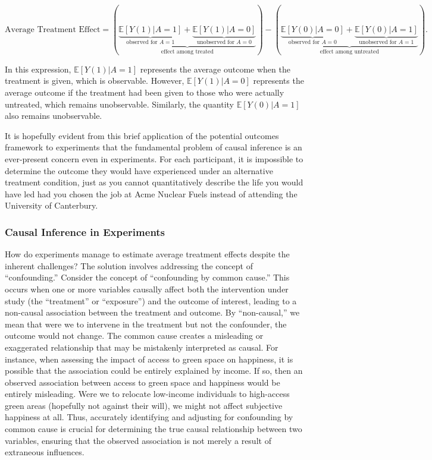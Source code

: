 \documentclass[
  singlecolumn]{article}
\begin{document}
\[
\text{Average Treatment Effect} = \left(\underbrace{\underbrace{\mathbb{E}[Y(1)|A = 1]}_{\text{observed for } A = 1} + \underbrace{\mathbb{E}[Y(1)|A = 0]}_{\text{unobserved for } A = 0}}_{\text{effect among treated}}\right) - \left(\underbrace{\underbrace{\mathbb{E}[Y(0)|A = 0]}_{\text{observed for } A = 0} + \underbrace{\mathbb{E}[Y(0)|A = 1]}_{\text{unobserved for } A = 1}}_{\text{effect among untreated}}\right).
\]

In this expression, \(\mathbb{E}[Y(1)|A = 1]\) represents the average
outcome when the treatment is given, which is observable. However,
\(\mathbb{E}[Y(1)|A = 0]\) represents the average outcome if the
treatment had been given to those who were actually untreated, which
remains unobservable. Similarly, the quantity \(\mathbb{E}[Y(0)|A = 1]\)
also remains unobservable.

It is hopefully evident from this brief application of the potential
outcomes framework to experiments that the fundamental problem of causal
inference is an ever-present concern even in experiments. For each
participant, it is impossible to determine the outcome they would have
experienced under an alternative treatment condition, just as you cannot
quantitatively describe the life you would have led had you chosen the
job at Acme Nuclear Fuels instead of attending the University of
Canterbury.

\subsubsection{Causal Inference in
Experiments}\label{causal-inference-in-experiments}

How do experiments manage to estimate average treatment effects despite
the inherent challenges? The solution involves addressing the concept of
``confounding.'' Consider the concept of ``confounding by common
cause.'' This occurs when one or more variables causally affect both the
intervention under study (the ``treatment'' or ``exposure'') and the
outcome of interest, leading to a non-causal association between the
treatment and outcome. By ``non-causal,'' we mean that were we to
intervene in the treatment but not the confounder, the outcome would not
change. The common cause creates a misleading or exaggerated
relationship that may be mistakenly interpreted as causal. For instance,
when assessing the impact of access to green space on happiness, it is
possible that the association could be entirely explained by income. If
so, then an observed association between access to green space and
happiness would be entirely misleading. Were we to relocate low-income
individuals to high-access green areas (hopefully not against their
will), we might not affect subjective happiness at all. Thus, accurately
identifying and adjusting for confounding by common cause is crucial for
determining the true causal relationship between two variables, ensuring
that the observed association is not merely a result of extraneous
influences.
\end{document}
